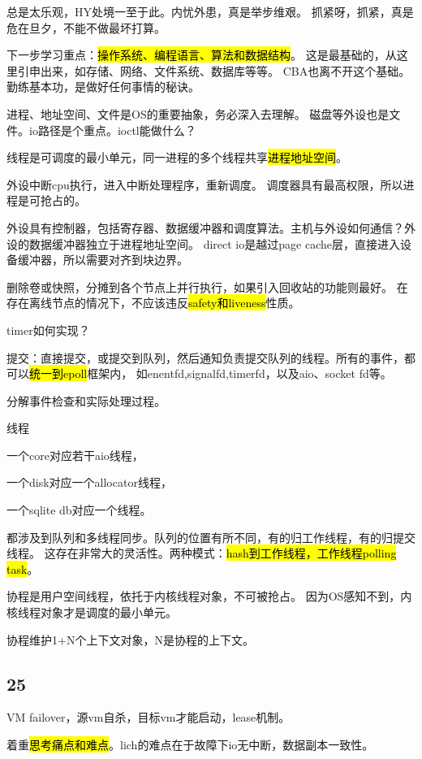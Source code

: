 总是太乐观，HY处境一至于此。内忧外患，真是举步维艰。
抓紧呀，抓紧，真是危在旦夕，不能不做最坏打算。

下一步学习重点：\hl{操作系统、编程语言、算法和数据结构}。
这是最基础的，从这里引申出来，如存储、网络、文件系统、数据库等等。
CBA也离不开这个基础。勤练基本功，是做好任何事情的秘诀。

进程、地址空间、文件是OS的重要抽象，务必深入去理解。
磁盘等外设也是文件。io路径是个重点。ioctl能做什么？

线程是可调度的最小单元，同一进程的多个线程共享\hl{进程地址空间}。

外设中断cpu执行，进入中断处理程序，重新调度。
调度器具有最高权限，所以进程是可抢占的。

外设具有控制器，包括寄存器、数据缓冲器和调度算法。主机与外设如何通信？外设的数据缓冲器独立于进程地址空间。
direct io是越过page cache层，直接进入设备缓冲器，所以需要对齐到块边界。

删除卷或快照，分摊到各个节点上并行执行，如果引入回收站的功能则最好。
在存在离线节点的情况下，不应该违反\hl{safety和liveness}性质。

timer如何实现？

提交：直接提交，或提交到队列，然后通知负责提交队列的线程。所有的事件，都可以\hl{统一到epoll}框架内，
如enentfd,signalfd,timerfd，以及aio、socket fd等。

分解事件检查和实际处理过程。

线程
\begin{enumbox}
\item 一个core对应若干aio线程，
\item 一个disk对应一个allocator线程，
\item 一个sqlite db对应一个线程。
\end{enumbox}

都涉及到队列和多线程同步。队列的位置有所不同，有的归工作线程，有的归提交线程。
这存在非常大的灵活性。两种模式：\hl{hash到工作线程，工作线程polling task}。

协程是用户空间线程，依托于内核线程对象，不可被抢占。
因为OS感知不到，内核线程对象才是调度的最小单元。

协程维护1+N个上下文对象，N是协程的上下文。

\subsection{25}

VM failover，源vm自杀，目标vm才能启动，lease机制。

着重\hl{思考痛点和难点}。lich的难点在于故障下io无中断，数据副本一致性。

